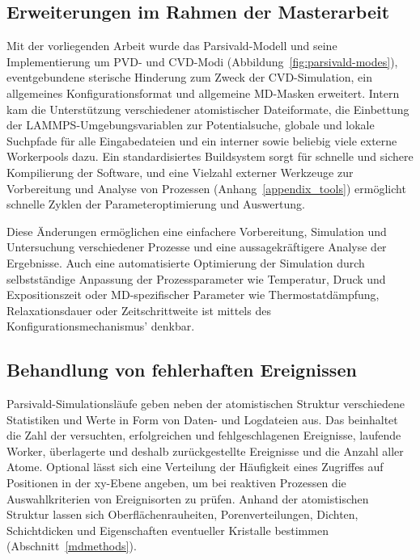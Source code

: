 \subsection{Erweiterungen im Rahmen der Masterarbeit}

Mit der vorliegenden Arbeit wurde das Parsivald-Modell und seine Implementierung um PVD- und CVD-Modi (Abbildung~\ref{fig:parsivald-modes}), eventgebundene sterische Hinderung zum Zweck der CVD-Simu\-lation, ein allgemeines Konfigurationsformat und allgemeine MD-Masken erweitert.
Intern kam die Unterstützung verschiedener atomistischer Dateiformate, die Einbettung der LAMMPS-Umgebungs\-variablen zur Potentialsuche, globale und lokale Suchpfade für alle Eingabedateien und ein interner sowie beliebig viele externe Workerpools dazu.
Ein standardisiertes Buildsystem sorgt für schnelle und sichere Kompilierung der Software, und eine Vielzahl externer Werkzeuge zur Vorbereitung und Analyse von Prozessen (Anhang~\ref{appendix_tools}) ermöglicht schnelle Zyklen der Parameteroptimierung und Auswertung.

Diese Änderungen ermöglichen eine einfachere Vorbereitung, Simulation und Untersuchung verschiedener Prozesse und eine aussagekräftigere Analyse der Ergebnisse.
Auch eine automatisierte Optimierung der Simulation durch selbstständige Anpassung der Prozessparameter wie Temperatur, Druck und Expositionszeit oder MD-spezifischer Parameter wie Thermostatdämpfung, Relaxationsdauer oder Zeitschrittweite ist mittels des Konfigurationsmechanismus' denkbar.


\subsection{Behandlung von fehlerhaften Ereignissen}

Parsivald-Simulationsläufe geben neben der atomistischen Struktur verschiedene Statistiken und Werte in Form von Daten- und Logdateien aus.
Das beinhaltet die Zahl der versuchten, erfolgreichen und fehlgeschlagenen Ereignisse, laufende Worker, überlagerte und deshalb zurückgestellte Ereignisse und die Anzahl aller Atome.
Optional lässt sich eine Verteilung der Häufigkeit eines Zugriffes auf Positionen in der xy-Ebene angeben, um bei reaktiven Prozessen die Auswahlkriterien von Ereignisorten zu prüfen.
Anhand der atomistischen Struktur lassen sich Oberflächenrauheiten, Porenverteilungen, Dichten, Schichtdicken und Eigenschaften eventueller Kristalle bestimmen (Abschnitt~\ref{mdmethods}).

